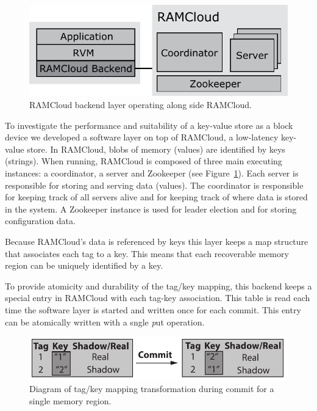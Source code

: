 
\begin{figure}[t!]
\begin{center}
\includegraphics[scale=0.60]{graphs/ramcloud_backend_design_final.pdf}
\end{center}
\caption{RAMCloud backend layer operating along side RAMCloud.}
\label{fig:ramcloud_backend_design}
\end{figure}

To investigate the performance and suitability of a key-value store as a block device we developed a software layer on top of RAMCloud, a low-latency key-value store.
In RAMCloud, blobs of memory (values) are identified by keys (strings). When running, RAMCloud is composed of three main executing instances: a coordinator, a server and Zookeeper (see Figure~\ref{fig:ramcloud_backend_design}).
Each server is responsible for storing and serving data (values). The coordinator is responsible for keeping track of all servers alive and for keeping track of where data is stored in the system.
A Zookeeper instance is used for leader election and for storing configuration data.

Because RAMCloud's data is referenced by keys this layer keeps a map structure that associates each tag to a key. This means that each recoverable memory region can be uniquely identified by a key.

To provide atomicity and durability of the tag/key mapping, this backend keeps a special entry in RAMCloud with each tag-key association. This table is read each time the software layer is started and written once for each commit. This entry can be atomically written with a sngle {\emph put} operation.


\begin{figure}[t!]
\begin{center}
\includegraphics[scale=0.60]{graphs/ramcloud_backend_commit.pdf}
\end{center}
\caption{Diagram of tag/key mapping transformation during commit for a single memory region.}
\label{fig:ramcloud_backend_commit}
\end{figure}

